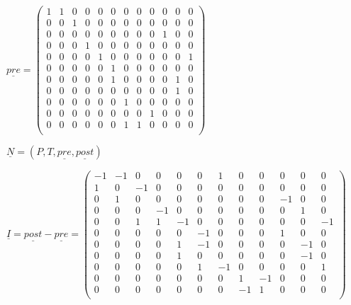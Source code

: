 \documentclass{scrreprt}
\begin{document}
\begin{enumerate}
\begin{enumerate}
\( \underline{pre} = \begin{pmatrix}
1 & 1 & 0 & 0 & 0 & 0 & 0 & 0 & 0 & 0 & 0 & 0 \\ %
0 & 0 & 1 & 0 & 0 & 0 & 0 & 0 & 0 & 0 & 0 & 0 \\ %
0 & 0 & 0 & 0 & 0 & 0 & 0 & 0 & 0 & 1 & 0 & 0 \\ %
0 & 0 & 0 & 1 & 0 & 0 & 0 & 0 & 0 & 0 & 0 & 0 \\ %
0 & 0 & 0 & 0 & 1 & 0 & 0 & 0 & 0 & 0 & 0 & 1 \\ %
0 & 0 & 0 & 0 & 0 & 1 & 0 & 0 & 0 & 0 & 0 & 0 \\ %
0 & 0 & 0 & 0 & 0 & 1 & 0 & 0 & 0 & 0 & 1 & 0 \\ %
0 & 0 & 0 & 0 & 0 & 0 & 0 & 0 & 0 & 0 & 1 & 0 \\ %
0 & 0 & 0 & 0 & 0 & 0 & 1 & 0 & 0 & 0 & 0 & 0 \\ %
0 & 0 & 0 & 0 & 0 & 0 & 0 & 0 & 1 & 0 & 0 & 0 \\ %
0 & 0 & 0 & 0 & 0 & 0 & 1 & 1 & 0 & 0 & 0 & 0 \\ %
\end{pmatrix}\)

\( \underline{N} = (P, T, \underline{pre}, \underline{post})\)

\( \underline{I} = \underline{post} - \underline{pre} = \begin{pmatrix}
-1 &-1 & 0 & 0 & 0 & 0 & 1 & 0 & 0 & 0 & 0 & 0 \\ %
 1 & 0 &-1 & 0 & 0 & 0 & 0 & 0 & 0 & 0 & 0 & 0 \\ %
 0 & 1 & 0 & 0 & 0 & 0 & 0 & 0 & 0 &-1 & 0 & 0 \\ %
 0 & 0 & 0 &-1 & 0 & 0 & 0 & 0 & 0 & 0 & 1 & 0 \\ %
 0 & 0 & 1 & 1 &-1 & 0 & 0 & 0 & 0 & 0 & 0 &-1 \\ %
 0 & 0 & 0 & 0 & 0 &-1 & 0 & 0 & 0 & 1 & 0 & 0 \\ %
 0 & 0 & 0 & 0 & 1 &-1 & 0 & 0 & 0 & 0 &-1 & 0 \\ %
 0 & 0 & 0 & 0 & 1 & 0 & 0 & 0 & 0 & 0 &-1 & 0 \\ %
 0 & 0 & 0 & 0 & 0 & 1 &-1 & 0 & 0 & 0 & 0 & 1 \\ %
 0 & 0 & 0 & 0 & 0 & 0 & 0 & 1 &-1 & 0 & 0 & 0 \\ %
 0 & 0 & 0 & 0 & 0 & 0 & 0 &-1 & 1 & 0 & 0 & 0 \\ %
\end{pmatrix} \)


\end{enumerate}
\end{enumerate}
\end{document}
